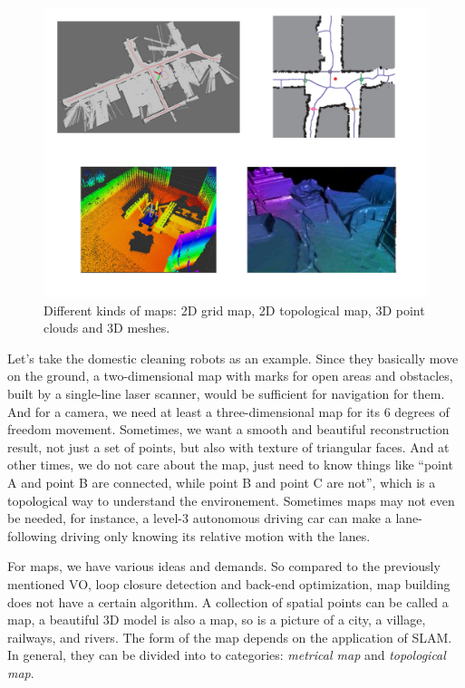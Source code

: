 \begin{figure}
	\centering
	\includegraphics[width=1.0\textwidth]{./resources/whatIsSLAM/map.pdf}
	\caption{Different kinds of maps: 2D grid map, 2D topological map, 3D point clouds and 3D meshes.}
	\label{fig:mapping}
\end{figure}

Let's take the domestic cleaning robots as an example. Since they basically move on the ground, a two-dimensional map with marks for open areas and obstacles, built by a single-line laser scanner, would be sufficient for navigation for them. And for a camera, we need at least a three-dimensional map for its 6 degrees of freedom movement. Sometimes, we want a smooth and beautiful reconstruction result, not just a set of points, but also with texture of triangular faces. And at other times, we do not care about the map, just need to know things like ``point A and point B are connected, while point B and point C are not'', which is a topological way to understand the environement. Sometimes maps may not even be needed, for instance, a level-3 autonomous driving car can make a lane-following driving only knowing its relative motion with the lanes.

For maps, we have various ideas and demands. So compared to the previously mentioned VO, loop closure detection and back-end optimization, map building does not have a certain algorithm. A collection of spatial points can be called a map, a beautiful 3D model is also a map, so is a picture of a city, a village, railways, and rivers. The form of the map depends on the application of SLAM. In general, they can be divided into to categories: \emph{metrical map} and \emph{topological map}.

